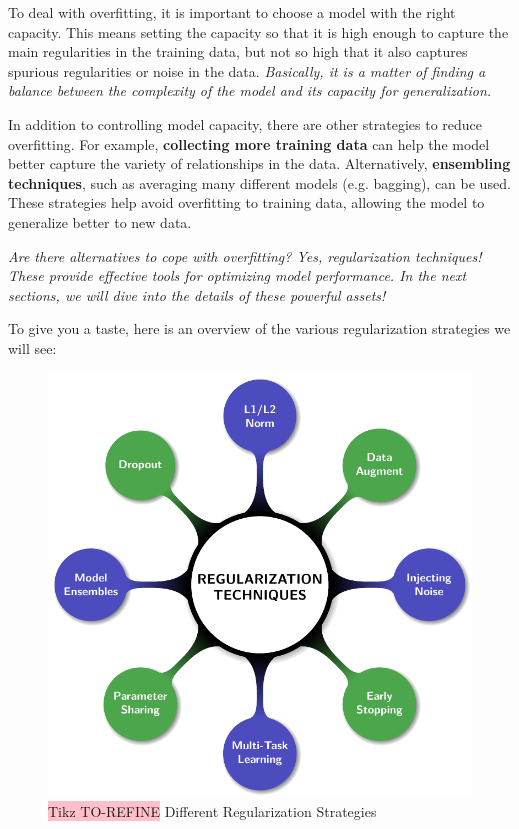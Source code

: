 To deal with overfitting, it is important to choose a model with the right capacity. This means setting the capacity so that it is high enough to capture the main regularities in the training data, but not so high that it also captures spurious regularities or noise in the data. \textit{Basically, it is a matter of finding a balance between the complexity of the model and its capacity for generalization.}

In addition to controlling model capacity, there are other strategies to reduce overfitting. For example, \textbf{collecting more training data} can help the model better capture the variety of relationships in the data. Alternatively, \textbf{ensembling techniques}, such as averaging many different models (e.g. bagging), can be used. These strategies help avoid overfitting to training data, allowing the model to generalize better to new data.

\textit{Are there alternatives to cope with overfitting? Yes, regularization techniques! These provide effective tools for optimizing model performance. In the next sections, we will dive into the details of these powerful assets!}

To give you a taste, here is an overview of the various regularization strategies we will see:

\begin{figure}[!htbp]
    \centering
    \includegraphics[width = 0.8\linewidth]{tikz/chapter4 - Regularization Schema.pdf}
    \caption{{\color{red}\colorbox{pink}{Tikz TO-REFINE}} Different Regularization Strategies}
\end{figure}

